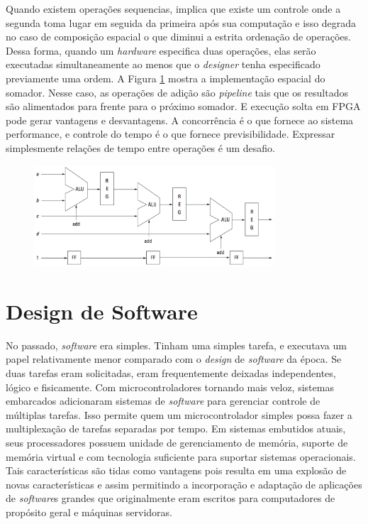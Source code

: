 Quando existem operações sequencias, implica que existe um controle onde a segunda toma lugar em seguida da primeira após sua computação e isso degrada no caso de composição espacial o que diminui a estrita ordenação de operações. Dessa forma, quando um \textit{hardware} especifica duas operações, elas serão executadas simultaneamente ao menos que o \textit{\textit{design}er} tenha especificado previamente uma ordem. A Figura \ref{fig:f3-14} mostra a implementação espacial do somador. Nesse caso, as operações de adição são \textit{pipeline} tais que os resultados são alimentados para frente para o próximo somador. E execução solta em FPGA pode gerar vantagens e desvantagens. A concorrência é o que fornece ao sistema performance, e controle do tempo é o que fornece previsibilidade. Expressar simplesmente relações de tempo entre operações é um desafio.

\begin{figure}[h] \centering
	\includegraphics[width=0.8\textwidth]{img/f3-14.png}
	\caption{}
	\label{fig:f3-14}
\end{figure}


\section{Design de Software}

No passado, \textit{software} era simples. Tinham uma simples tarefa, e executava um papel relativamente menor comparado com o \textit{design} de \textit{software} da época. Se duas tarefas eram solicitadas, eram frequentemente deixadas independentes, lógico e fisicamente. Com microcontroladores tornando mais veloz, sistemas embarcados adicionaram sistemas de \textit{software} para gerenciar controle de múltiplas tarefas. Isso permite quem um microcontrolador simples possa fazer a multiplexação de tarefas separadas por tempo. Em sistemas embutidos atuais, seus processadores possuem unidade de gerenciamento de memória, suporte de memória virtual e com tecnologia suficiente para suportar sistemas operacionais. Tais características são tidas como vantagens pois resulta em uma explosão de novas características e assim permitindo a incorporação e adaptação de aplicações de \textit{software}s grandes que originalmente eram escritos para computadores de propósito geral e máquinas servidoras.


